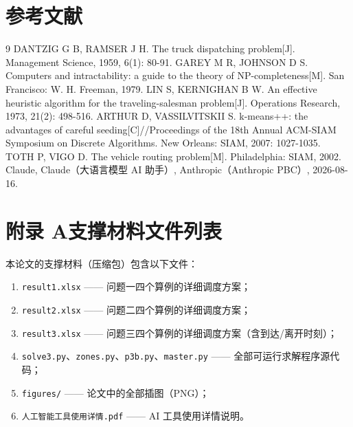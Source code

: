 \documentclass[12pt,a4paper]{ctexart}
\begin{document}
\section{参考文献}

\begin{thebibliography}{9}
 DANTZIG G B, RAMSER J H. The truck dispatching problem[J]. Management Science, 1959, 6(1): 80-91.
 GAREY M R, JOHNSON D S. Computers and intractability: a guide to the theory of NP-completeness[M]. San Francisco: W. H. Freeman, 1979.
 LIN S, KERNIGHAN B W. An effective heuristic algorithm for the traveling-salesman problem[J]. Operations Research, 1973, 21(2): 498-516.
 ARTHUR D, VASSILVITSKII S. k-means++: the advantages of careful seeding[C]//Proceedings of the 18th Annual ACM-SIAM Symposium on Discrete Algorithms. New Orleans: SIAM, 2007: 1027-1035.
 TOTH P, VIGO D. The vehicle routing problem[M]. Philadelphia: SIAM, 2002.
 Claude, Claude（大语言模型 AI 助手）, Anthropic（Anthropic PBC）, 2026-08-16.
\end{thebibliography}

\clearpage

\appendix
\section*{附录 A\quad 支撑材料文件列表}

本论文的支撑材料（压缩包）包含以下文件：
\begin{enumerate}
  \item \texttt{result1.xlsx} —— 问题一四个算例的详细调度方案；
  \item \texttt{result2.xlsx} —— 问题二四个算例的详细调度方案；
  \item \texttt{result3.xlsx} —— 问题三四个算例的详细调度方案（含到达/离开时刻）；
  \item \texttt{solve3.py}、\texttt{zones.py}、\texttt{p3b.py}、\texttt{master.py} —— 全部可运行求解程序源代码；
  \item \texttt{figures/} —— 论文中的全部插图（PNG）；
  \item \texttt{人工智能工具使用详情.pdf} —— AI 工具使用详情说明。
\end{enumerate}
\end{document}
